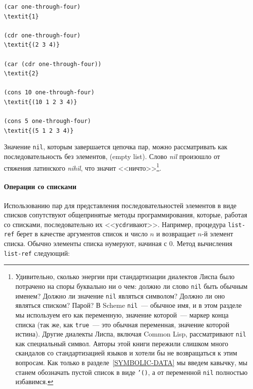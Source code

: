 \begin{Verbatim}[fontsize=\small]
(car one-through-four)
\textit{1}

(cdr one-through-four)
\textit{(2 3 4)}

(car (cdr one-through-four))
\textit{2}

(cons 10 one-through-four)
\textit{(10 1 2 3 4)}

(cons 5 one-through-four)
\textit{(5 1 2 3 4)}
\end{Verbatim}
Значение {\tt nil}, которым завершается цепочка пар, можно
рассматривать как последовательность без элементов, 
 (empty list).
Слово {\em nil}
произошло от стяжения латинского {\em nihil}, что значит
<<ничто>>\footnote{Удивительно, сколько энергии при стандартизации
диалектов Лиспа было потрачено на споры буквально ни о чем: должно ли
слово {\tt nil} быть обычным именем? Должно ли значение
{\tt nil} являться символом? Должно ли оно являться списком?
Парой?  В Scheme {\tt nil}~--- обычное имя, и в этом 
разделе мы используем его как переменную, значение которой~--- маркер
конца списка (так же, как {\tt true}~--- это обычная
переменная, значение которой истина).  Другие диалекты Лиспа,
включая Common
Lisp, рассматривают {\tt nil} как специальный
символ.  Авторы этой книги пережили слишком много скандалов
со стандартизацией языков и хотели бы не возвращаться к этим вопросам.  Как
только в разделе~\ref{SYMBOLIC-DATA} мы введем кавычку, мы
станем обозначать пустой список в виде {\tt '()}, а от
переменной {\tt nil} полностью избавимся.}.

\paragraph{Операции со списками}


Использованию пар для представления
последовательностей
элементов в виде списков сопутствуют общепринятые методы
программирования, которые, работая со списками, последовательно их
<<у{\tt cdr}ивают>>.
Например, процедура {\tt list-ref}
берет в качестве аргументов список и число $n$ и возвращает
$n$-й элемент списка.  Обычно
элементы списка нумеруют,
начиная с 0.  Метод вычисления {\tt list-ref} следующий:

